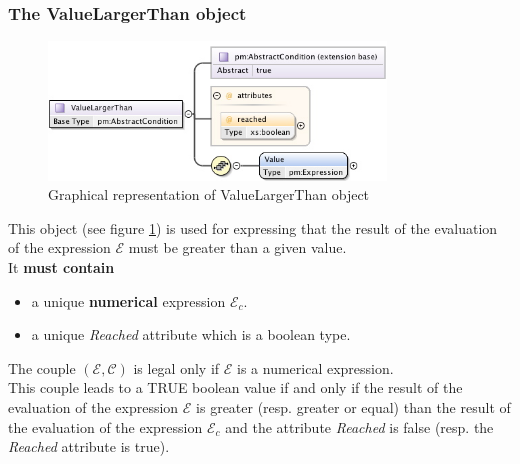 \documentclass[a4paper,11pt] {article}
\begin{document}
\subsubsection{The ValueLargerThan object}
\begin{figure}[htbp]
\begin{center}
\includegraphics[width=0.8\textwidth]{pictures/ValueLargerThan.jpg} 
\caption{Graphical representation of ValueLargerThan object}
\label{Pic-ValueLargerThan}
\end{center}
\end{figure}
This object (see figure \ref{Pic-ValueLargerThan}) is used for expressing that the result of the
evaluation of the expression $\mathcal E$ must be greater than a given value.\\
It {\bf must contain}
\begin{itemize}
\item a unique {\bf numerical} expression $\mathcal E_c$. 
\item a unique {\it Reached} attribute which is a boolean type.
\end{itemize}
The couple $(\mathcal E, \mathcal C)$ is legal only if $\mathcal E$ is a numerical expression.\\
This couple leads to a TRUE boolean value if and only if the result of the evaluation of the
expression $\mathcal E$ is greater (resp. greater or equal) than the result of the evaluation of the
expression $\mathcal E_c$ and the attribute {\it Reached} is false (resp. the {\it Reached}
attribute is true).
\end{document}

